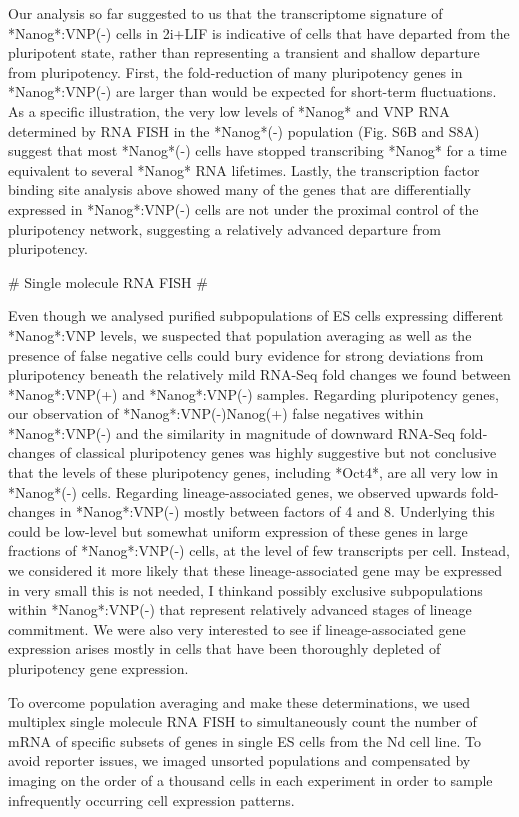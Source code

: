 \documentclass[aps,prl,twocolumn,superscriptaddress]{revtex4}
\begin{document}
Our analysis so far suggested to us that the transcriptome signature of *Nanog*:VNP(-) cells in 2i+LIF is indicative of cells that have departed from the pluripotent state, rather than representing a transient and shallow departure from pluripotency. First, the fold-reduction of  many pluripotency genes in *Nanog*:VNP(-) are larger than would be expected for short-term fluctuations. As a specific illustration, the very low levels of *Nanog* and VNP RNA determined by RNA FISH in the *Nanog*(-) population (Fig. S6B and S8A) suggest that most *Nanog*(-) cells have stopped transcribing *Nanog* for a time equivalent to several *Nanog* RNA lifetimes. Lastly, the transcription factor binding site analysis above showed many of the genes that are differentially expressed in *Nanog*:VNP(-) cells are not under the proximal control of the pluripotency network, suggesting a relatively advanced departure from pluripotency.




# Single molecule RNA FISH #


Even though we analysed purified subpopulations of ES cells expressing different *Nanog*:VNP levels, we suspected that population averaging as well as the presence of false negative cells could bury evidence for strong deviations from pluripotency beneath the relatively mild RNA-Seq fold changes we found between *Nanog*:VNP(+) and *Nanog*:VNP(-) samples. Regarding pluripotency genes, our observation of *Nanog*:VNP(-)Nanog(+) false negatives within *Nanog*:VNP(-) and the similarity in magnitude of downward RNA-Seq fold-changes of classical pluripotency genes was highly suggestive but not conclusive that the levels of these pluripotency genes, including *Oct4*, are all very low in *Nanog*(-) cells. Regarding lineage-associated genes, we observed upwards fold-changes in *Nanog*:VNP(-) mostly between factors of 4 and 8. Underlying this could be low-level but somewhat uniform expression of these genes in large fractions of *Nanog*:VNP(-) cells, at the level of few transcripts per cell. Instead, we considered it more likely that these lineage-associated gene may be expressed in very small this is not needed, I thinkand possibly exclusive subpopulations within *Nanog*:VNP(-) that represent relatively advanced stages of lineage commitment. We were also very interested to see if lineage-associated gene expression arises mostly in cells that have been thoroughly depleted of pluripotency gene expression. 

To overcome population averaging and make these determinations, we used multiplex single molecule RNA FISH to simultaneously count the number of mRNA of specific subsets of genes in single ES cells from the Nd cell line. To avoid reporter issues, we imaged unsorted populations and compensated by imaging on the order of a thousand cells in each experiment in order to sample infrequently occurring cell expression patterns.
\end{document}
